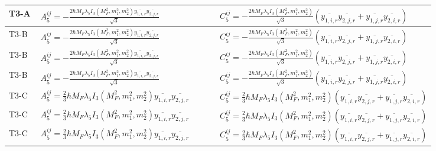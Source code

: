 \documentclass[8pt]{article}
\begin{document}
\begin{landscape}
\begin{longtable}{@{}l >{\raggedright\arraybackslash}p{0.42\linewidth} >{\raggedright\arraybackslash}p{0.42\linewidth}@{}}
\midrule
T3-A & \(\displaystyle A_5^{ij}=-\frac{2 \hbar  M_F \lambda_5 I_3\left(M_F^2,m_1^2,m_2^2\right) \overline{y_{1,i,r}} \overline{y_{2,j,r}}}{\sqrt{3}}\) & \(\displaystyle C_5^{ij}=-\frac{2 \hbar  M_F \lambda_5 I_3\left(M_F^2,m_1^2,m_2^2\right) }{\sqrt{3}}\left(\overline{y_{1,i,r}} \overline{y_{2,j,r}}+\overline{y_{1,j,r}} \overline{y_{2,i,r}}\right)\) \\
\midrule
T3-B & \(\displaystyle A_5^{ij}=-\frac{2 \hbar  M_F \lambda_5 I_3\left(M_F^2,m_1^2,m_2^2\right) \overline{y_{1,i,r}} \overline{y_{2,j,r}}}{\sqrt{3}}\) & \(\displaystyle C_5^{ij}=-\frac{2 \hbar  M_F \lambda_5 I_3\left(M_F^2,m_1^2,m_2^2\right) }{\sqrt{3}}\left(\overline{y_{1,i,r}} \overline{y_{2,j,r}}+\overline{y_{1,j,r}} \overline{y_{2,i,r}}\right)\) \\
\midrule
T3-B & \(\displaystyle A_5^{ij}=-\frac{2 \hbar  M_F \lambda_5 I_3\left(M_F^2,m_1^2,m_2^2\right) \overline{y_{1,i,r}} \overline{y_{2,j,r}}}{\sqrt{3}}\) & \(\displaystyle C_5^{ij}=-\frac{2 \hbar  M_F \lambda_5 I_3\left(M_F^2,m_1^2,m_2^2\right) }{\sqrt{3}}\left(\overline{y_{1,i,r}} \overline{y_{2,j,r}}+\overline{y_{1,j,r}} \overline{y_{2,i,r}}\right)\) \\
\midrule
T3-B & \(\displaystyle A_5^{ij}=-\frac{2 \hbar  M_F \lambda_5 I_3\left(M_F^2,m_1^2,m_2^2\right) \overline{y_{1,i,r}} \overline{y_{2,j,r}}}{\sqrt{3}}\) & \(\displaystyle C_5^{ij}=-\frac{2 \hbar  M_F \lambda_5 I_3\left(M_F^2,m_1^2,m_2^2\right) }{\sqrt{3}}\left(\overline{y_{1,i,r}} \overline{y_{2,j,r}}+\overline{y_{1,j,r}} \overline{y_{2,i,r}}\right)\) \\
\midrule
T3-C & \(\displaystyle A_5^{ij}=\frac{2}{3} \hbar  M_F \lambda_5 I_3\left(M_F^2,m_1^2,m_2^2\right) \overline{y_{1,i,r}} \overline{y_{2,j,r}}\) & \(\displaystyle C_5^{ij}=\frac{2}{3} \hbar  M_F \lambda_5 I_3\left(M_F^2,m_1^2,m_2^2\right)\left(\overline{y_{1,i,r}} \overline{y_{2,j,r}}+\overline{y_{1,j,r}} \overline{y_{2,i,r}}\right)\) \\
\midrule
T3-C & \(\displaystyle A_5^{ij}=\frac{2}{3} \hbar  M_F \lambda_5 I_3\left(M_F^2,m_1^2,m_2^2\right) \overline{y_{1,i,r}} \overline{y_{2,j,r}}\) & \(\displaystyle C_5^{ij}=\frac{2}{3} \hbar  M_F \lambda_5 I_3\left(M_F^2,m_1^2,m_2^2\right)\left(\overline{y_{1,i,r}} \overline{y_{2,j,r}}+\overline{y_{1,j,r}} \overline{y_{2,i,r}}\right)\) \\
\midrule
T3-C & \(\displaystyle A_5^{ij}=\frac{2}{3} \hbar  M_F \lambda_5 I_3\left(M_F^2,m_1^2,m_2^2\right) \overline{y_{1,i,r}} \overline{y_{2,j,r}}\) & \(\displaystyle C_5^{ij}=\frac{2}{3} \hbar  M_F \lambda_5 I_3\left(M_F^2,m_1^2,m_2^2\right)\left(\overline{y_{1,i,r}} \overline{y_{2,j,r}}+\overline{y_{1,j,r}} \overline{y_{2,i,r}}\right)\) \\

\end{longtable}
\end{landscape}
\end{document}
